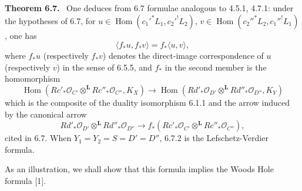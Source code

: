 \documentclass[11pt]{article}
\newenvironment{statement}[1]{\par\medskip\noindent\textbf{#1.}\ }{\par\medskip}
\DeclareMathOperator{\Hom}{Hom}
\providecommand{\LL}{\mathbf L}
\providecommand{\OO}{\mathcal O}
\begin{document}
\begin{statement}{Theorem 6.7}
One deduces from 6.7 formulae analogous to 4.5.1, 4.7.1: under the hypotheses of 6.7, for $u\in\Hom(c_1'^*L_1,c_2'^!L_2)$, $v\in\Hom(c_2''^*L_2,c_1''^!L_1)$, one has
\begin{equation}
\tag{6.7.2}
\langle f_*u,f_*v\rangle=f_*\langle u,v\rangle,
\end{equation}
where $f_*u$ (respectively $f_*v$) denotes the direct-image correspondence of $u$ (respectively $v$) in the sense of 6.5.5, and $f_*$ in the second member is the homomorphism
\begin{equation}
\tag{6.7.3}
\Hom(Rc'_*\OO_{C'}\otimes^{\LL}Rc''_*\OO_{C''},K_X)
\longrightarrow
\Hom(Rd'_*\OO_{D'}\otimes^{\LL}Rd''_*\OO_{D''},K_Y)
\end{equation}
which is the composite of the duality isomorphism 6.1.1 and the arrow induced by the canonical arrow
\[
Rd'_*\OO_{D'}\otimes^{\LL}Rd''_*\OO_{D''}
\longrightarrow
f_*(Rc'_*\OO_{C'}\otimes^{\LL}Rc''_*\OO_{C''}),
\]
cited in 6.7. When $Y_1=Y_2=S=D'=D''$, 6.7.2 is the Lefschetz-Verdier formula.

As an illustration, we shall show that this formula implies the Woods Hole formula [1].
\end{statement}
\end{document}
